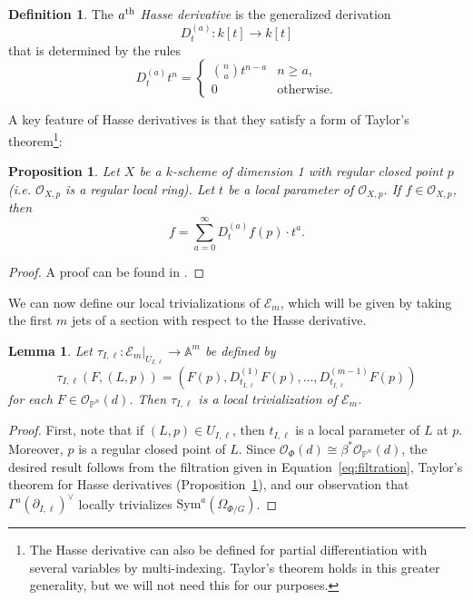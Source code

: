 \documentclass[12pt]{amsart}
\numberwithin{equation}{section}
\theoremstyle{plain}
\newtheorem{lem}[thm]{Lemma}
\newtheorem{prop}[thm]{Proposition}
\theoremstyle{definition}
\newtheorem{defn}[thm]{Definition}
\newcommand{\mb}[1]{\mathbb{#1}}
\newcommand{\mc}[1]{\mathcal{#1}}
\newcommand{\Sym}{\mathrm{Sym}}
\begin{document}
\begin{defn}
    The \emph{$a\textsuperscript{th}$ Hasse derivative} is the generalized derivation
    \[D_t^{(a)}\colon k[t]\to k[t]\]
    that is determined by the rules
    \[D_t^{(a)}t^n=\begin{cases} \binom{n}{a}t^{n-a} & n\geq a,\\
    0 & \text{otherwise}.
    \end{cases}\]
\end{defn}

A key feature of Hasse derivatives is that they satisfy a form of Taylor's theorem\footnote{The Hasse derivative can also be defined for partial differentiation with several variables by multi-indexing. Taylor's theorem holds in this greater generality, but we will not need this for our purposes.}:

\begin{prop}\label{prop:hasse-taylor}
    Let $X$ be a $k$-scheme of dimension 1 with regular closed point $p$ (i.e. $\mc{O}_{X,p}$ is a regular local ring). Let $t$ be a local parameter of $\mc{O}_{X,p}$. If $f\in\mc{O}_{X,p}$, then
    \[f=\sum_{a=0}^\infty D_t^{(a)}f(p)\cdot t^a.\]
\end{prop}
\begin{proof}
    A proof can be found in \cite[Corollary~2.5.14]{Gol03}.
\end{proof}

We can now define our local trivializations of $\mc{E}_m$, which will be given by taking the first $m$ jets of a section with respect to the Hasse derivative.

\begin{lem}\label{lem:local trivs}
    Let $\tau_{I,\ell}\colon \mc{E}_m|_{U_{I,\ell}}\to\mb{A}^m$ be defined by 
    \[\tau_{I,\ell}(F,(L,p))=(F(p),D^{(1)}_{t_{I,\ell}}F(p),\ldots,D^{(m-1)}_{t_{I,\ell}}F(p))\]
    for each $F\in\mc{O}_{\mb{P}^n}(d)$. Then $\tau_{I,\ell}$ is a local trivialization of $\mc{E}_m$.
\end{lem}
\begin{proof}
    First, note that if $(L,p)\in U_{I,\ell}$, then $t_{I,\ell}$ is a local parameter of $L$ at $p$. Moreover, $p$ is a regular closed point of $L$. Since $\mc{O}_\Phi(d)\cong\beta^*\mc{O}_{\mb{P}^n}(d)$, the desired result follows from the filtration given in Equation~\ref{eq:filtration}, Taylor's theorem for Hasse derivatives (Proposition~\ref{prop:hasse-taylor}), and our observation that $\Gamma^a(\partial_{I,\ell})^\vee$ locally trivializes $\Sym^a(\Omega_{\Phi/G})$.
\end{proof}
\end{document}
